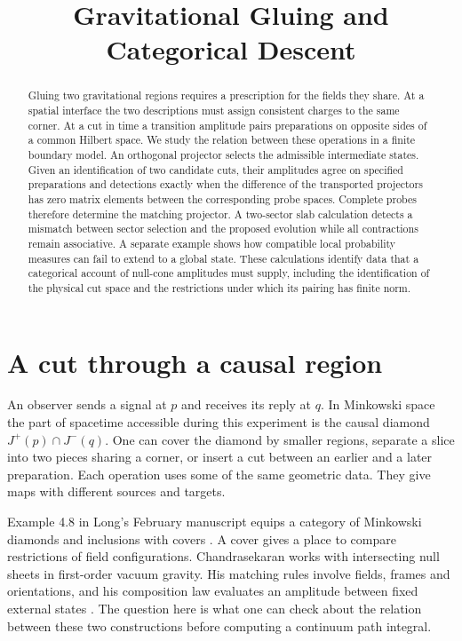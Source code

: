 \documentclass[11pt,letterpaper]{article}
\title{Gravitational Gluing and Categorical Descent\series{Part III}}
\begin{document}
\ifdefined\HCode\else{}\fi
\maketitle
\begin{abstract}
Gluing two gravitational regions requires a prescription for the fields they
share. At a spatial interface the two descriptions must assign consistent
charges to the same corner. At a cut in time a transition amplitude pairs
preparations on opposite sides of a common Hilbert space. We study the relation
between these operations in a finite boundary model. An orthogonal projector
selects the admissible intermediate states. Given an identification of two
candidate cuts, their amplitudes agree on specified preparations and detections
exactly when the difference of the transported projectors has zero matrix
elements between the corresponding probe spaces. Complete probes therefore
determine the matching projector. A two-sector slab calculation detects a mismatch between sector selection
and the proposed evolution while all contractions remain associative. A separate example shows how compatible local probability measures
can fail to extend to a global state. These calculations identify data that a
categorical account of null-cone amplitudes must supply, including the
identification of the physical cut space and the restrictions under which its
pairing has finite norm.
\end{abstract}

\section{A cut through a causal region}
\label{sec:region}
An observer sends a signal at \(p\) and receives its reply at \(q\). In
Minkowski space the part of spacetime accessible during this experiment is
the causal diamond \(J^+(p)\cap J^-(q)\). One can cover the diamond by
smaller regions, separate a slice into two pieces sharing a corner, or insert
a cut between an earlier and a later preparation. Each operation uses some
of the same geometric data. They give maps with different sources and
targets.

Example 4.8 in Long's February manuscript equips a category of Minkowski
diamonds and inclusions with covers \cite{long}. A cover gives a place to
compare restrictions of field configurations. Chandrasekaran works with
intersecting null sheets in first-order vacuum gravity. His matching rules
involve fields, frames and orientations, and his composition law evaluates
an amplitude between fixed external states \cite[Secs.~3.6, 4.4]{nc}.
The question here is what one can check about the relation between these two
constructions before computing a continuum path integral.
\end{document}
